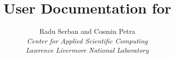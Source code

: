 \documentclass[twoside,openright,10pt]{report}
\title{User Documentation for {\idas} {\idasrelease}}
\author{
  Radu Serban and Cosmin Petra\\
  {\em Center for Applied Scientific Computing} \\
  {\em Lawrence Livermore National Laboratory}
}
\date{
  \today 
  \vfill 
  {\centerline{\psfig{figure=doc_logo.eps,width=0.5\textwidth}}}
  \vfill \idasucrlug
}
\begin{document}
\frontug
\renewcommand{\chaptermark}[1]{\markboth{#1}{}}
\renewcommand{\sectionmark}[1]{\markright{\thesection\ #1}}


\clearemptydoublepage

\clearemptydoublepage

\clearemptydoublepage

\clearemptydoublepage

\clearemptydoublepage

\clearemptydoublepage

\clearemptydoublepage

\clearemptydoublepage

\clearemptydoublepage

\clearemptydoublepage

\clearemptydoublepage


\clearemptydoublepage
\printindex
\clearemptydoublepage
\end{document}
